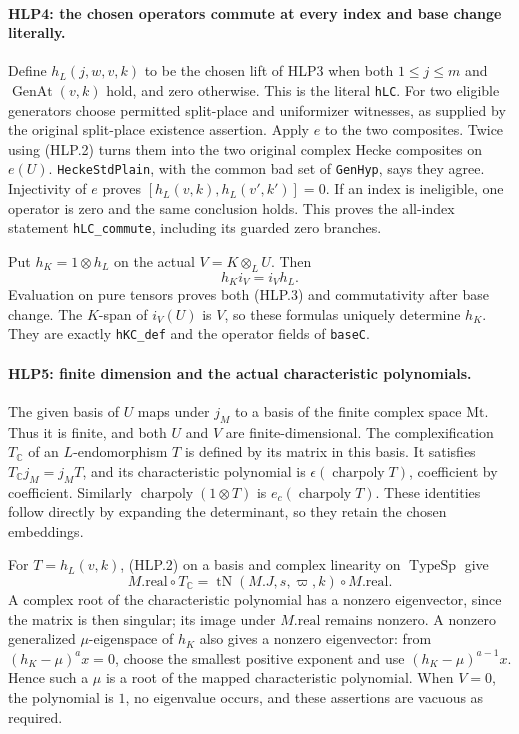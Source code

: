 \paragraph{HLP4: the chosen operators commute at every index and base change literally.}
\label{claim:HLP4}
Define \(h_L(j,w,v,k)\) to be the chosen lift of HLP3 when both
\(1\le j\le m\) and \(\operatorname{GenAt}(v,k)\) hold, and zero
otherwise. This is the literal \texttt{h\allowbreak LC}. For two eligible
generators choose permitted split-place and uniformizer witnesses,
as supplied by the original split-place existence assertion.
Apply \(e\) to the two composites. Twice using (HLP.2) turns them
into the two original complex Hecke composites on \(e(U)\).
\texttt{Hecke\allowbreak Std\allowbreak Plain}, with the common bad set of
\texttt{Gen\allowbreak Hyp}, says they agree. Injectivity of \(e\) proves
\([h_L(v,k),h_L(v',k')]=0\). If an index is ineligible, one operator
is zero and the same conclusion holds. This proves the all-index
statement \texttt{h\allowbreak LC\_\allowbreak commute}, including its guarded zero branches.

Put \(h_K=1\otimes h_L\) on the actual \(V=K\otimes_LU\). Then
\[
       h_K i_V=i_Vh_L.                              \tag{HLP.3}
\]
Evaluation on pure tensors proves both (HLP.3) and commutativity
after base change. The \(K\)-span of \(i_V(U)\) is \(V\), so these
formulas uniquely determine \(h_K\). They are exactly
\texttt{h\allowbreak KC\_\allowbreak def} and the operator fields of \texttt{base\allowbreak C}.

\paragraph{HLP5: finite dimension and the actual characteristic polynomials.}
\label{claim:HLP5}
The given basis of \(U\) maps under \(j_M\) to a basis of the finite
complex space \(\mathrm{Mt}\). Thus it is finite, and both \(U\) and
\(V\) are finite-dimensional. The complexification \(T_{\mathbb C}\)
of an \(L\)-endomorphism \(T\) is defined by its matrix in this basis.
It satisfies \(T_{\mathbb C}j_M=j_MT\), and its characteristic
polynomial is \(\epsilon(\operatorname{charpoly}T)\), coefficient by
coefficient. Similarly \(\operatorname{charpoly}(1\otimes T)\) is
\(e_c(\operatorname{charpoly}T)\). These identities follow directly
by expanding the determinant, so they retain the chosen embeddings.

For \(T=h_L(v,k)\), (HLP.2) on a basis and complex linearity on
\(\operatorname{TypeSp}\) give
\[
 M.\mathrm{real}\circ T_{\mathbb C}
   =\operatorname{tN}(M.J,s,\varpi,k)\circ M.\mathrm{real}. \tag{HLP.4}
\]
A complex root of the characteristic polynomial has a nonzero
eigenvector, since the matrix is then singular; its image under
\(M.\mathrm{real}\) remains nonzero. A nonzero generalized
\(\mu\)-eigenspace of \(h_K\) also gives a nonzero eigenvector: from
\((h_K-\mu)^a x=0\), choose the smallest positive exponent and use
\((h_K-\mu)^{a-1}x\). Hence such a \(\mu\) is a root of the mapped
characteristic polynomial. When \(V=0\), the polynomial is \(1\),
no eigenvalue occurs, and these assertions are vacuous as required.

